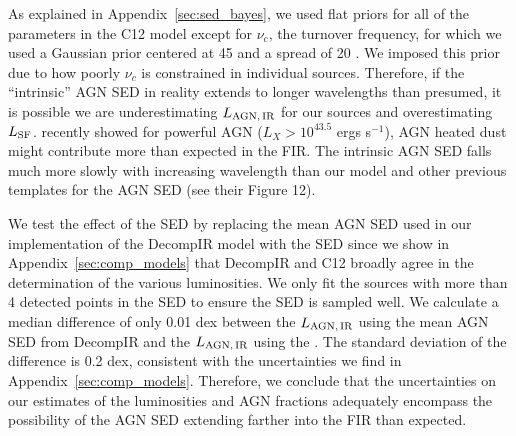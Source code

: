\documentclass[fleqn, usenatbib]{mnras}
\begin{document}
As explained in Appendix~\ref{sec:sed_bayes}, we used flat priors for all of the parameters in the C12 model except for $\nu_{c}$, the turnover frequency, for which we used a Gaussian prior centered at 45 \micron{} and a spread of 20 \micron. We imposed this prior due to how poorly $\nu_{c}$ is constrained in individual sources. Therefore, if the ``intrinsic'' AGN SED in reality extends to longer wavelengths than presumed, it is possible we are underestimating $L_{\rm AGN,\,IR}$ for our sources and overestimating $L_{\rm SF}$. \citet{Symeonidis:2016fk} recently showed for powerful AGN ($L_{X} > 10^{43.5}$ ergs s$^{-1}$), AGN heated dust might contribute more than expected in the FIR. The \citet{Symeonidis:2016fk} intrinsic AGN SED falls much more slowly with increasing wavelength than our model and other previous templates for the AGN SED (see their Figure 12). 

We test the effect of the \citet{Symeonidis:2016fk} SED by replacing the mean AGN SED used in our implementation of the DecompIR model with the \citet{Symeonidis:2016fk} SED since we show in Appendix~\ref{sec:comp_models} that DecompIR and C12 broadly agree in the determination of the various luminosities. We only fit the sources with more than 4 detected points in the SED to ensure the SED is sampled well. We calculate a median difference of only 0.01 dex between the $L_{\rm AGN,\,IR}$ using the mean AGN SED from DecompIR and the $L_{\rm AGN,\,IR}$ using the \citet{Symeonidis:2016fk}. The standard deviation of the difference is 0.2 dex, consistent with the uncertainties we find in Appendix~\ref{sec:comp_models}. Therefore, we conclude that the uncertainties on our estimates of the luminosities and AGN fractions adequately encompass the possibility of the AGN SED extending farther into the FIR than expected.
\end{document}

